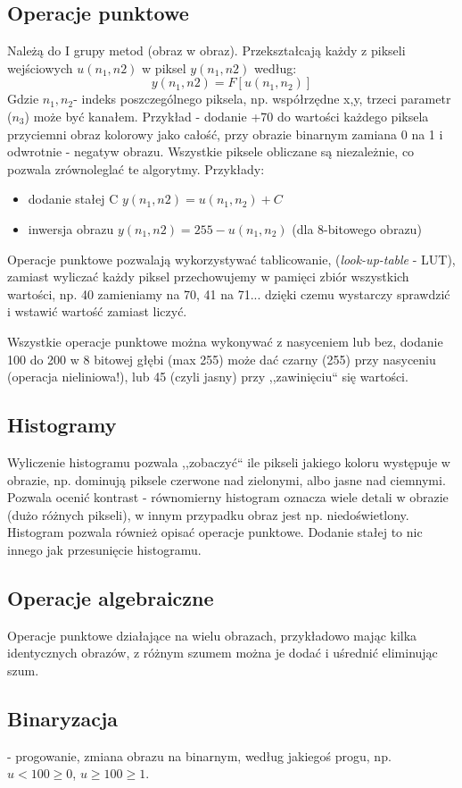 \documentclass[]{report}
\begin{document}
\subsection{Operacje punktowe}
Należą do I grupy metod (obraz w obraz). Przekształcają każdy z pikseli wejściowych $ u(n_1,n2) $ w piksel $ y(n_1,n2) $ według:
$$ y(n_1,n2) = F[u(n_1,n_2)] $$
Gdzie $n_1, n_2 $- indeks poszczególnego piksela, np. współrzędne x,y, trzeci parametr ($n_3$) może być kanałem.
Przykład - dodanie +70 do wartości każdego piksela przyciemni obraz kolorowy jako całość, przy obrazie binarnym zamiana 0 na 1 i odwrotnie - negatyw obrazu.
Wszystkie piksele obliczane są niezależnie, co pozwala zrównoleglać te algorytmy. Przykłady:
\begin{itemize}
	\item dodanie stałej C $ y(n_1,n2) = u(n_1,n_2) + C $
	\item inwersja obrazu  $ y(n_1,n2) = 255 - u(n_1,n_2) $ (dla 8-bitowego obrazu)
\end{itemize} 
Operacje punktowe pozwalają wykorzystywać tablicowanie, (\textit{look-up-table} - LUT), zamiast wyliczać każdy piksel przechowujemy w pamięci zbiór wszystkich wartości, np. 40 zamieniamy na 70, 41 na 71... dzięki czemu wystarczy sprawdzić i wstawić wartość zamiast liczyć.

Wszystkie operacje punktowe można wykonywać z nasyceniem lub bez, dodanie 100 do 200 w 8 bitowej głębi (max 255) może dać czarny (255) przy nasyceniu (operacja nieliniowa!), lub 45 (czyli jasny) przy ,,zawinięciu`` się wartości.
\subsection{Histogramy}
Wyliczenie histogramu pozwala ,,zobaczyć`` ile pikseli jakiego koloru występuje w obrazie, np. dominują piksele czerwone nad zielonymi, albo jasne nad ciemnymi.
Pozwala ocenić kontrast - równomierny histogram oznacza wiele detali w obrazie (dużo różnych pikseli), w innym przypadku obraz jest np. niedoświetlony. Histogram pozwala również opisać operacje punktowe. Dodanie stałej to nic innego jak przesunięcie histogramu.
\subsection{Operacje algebraiczne}
Operacje punktowe działające na wielu obrazach, przykładowo mając kilka identycznych obrazów, z różnym szumem można je dodać i uśrednić eliminując szum.
\subsection{Binaryzacja} - progowanie, zmiana obrazu na binarnym, według jakiegoś progu, np. $u<100 \ge 0$, $u \ge 100 \ge 1$.
\end{document}
